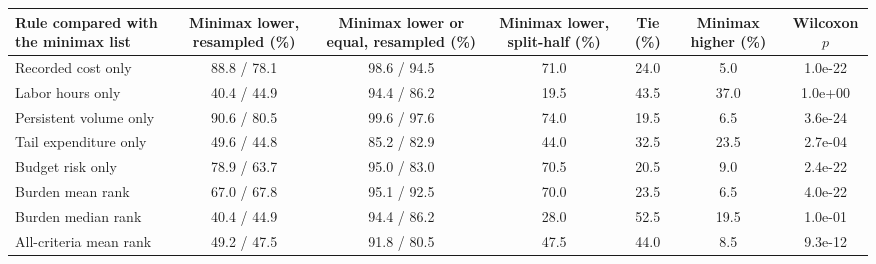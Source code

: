\begin{tabular}{p{3.6cm}cccccc}
\toprule
Rule compared with the minimax list & Minimax lower, resampled (\%) & Minimax lower or equal, resampled (\%) & Minimax lower, split-half (\%) & Tie (\%) & Minimax higher (\%) & Wilcoxon $p$ \\
\midrule
Recorded cost only & 88.8 / 78.1 & 98.6 / 94.5 & 71.0 & 24.0 & 5.0 & 1.0e-22 \\
Labor hours only & 40.4 / 44.9 & 94.4 / 86.2 & 19.5 & 43.5 & 37.0 & 1.0e+00 \\
Persistent volume only & 90.6 / 80.5 & 99.6 / 97.6 & 74.0 & 19.5 & 6.5 & 3.6e-24 \\
Tail expenditure only & 49.6 / 44.8 & 85.2 / 82.9 & 44.0 & 32.5 & 23.5 & 2.7e-04 \\
Budget risk only & 78.9 / 63.7 & 95.0 / 83.0 & 70.5 & 20.5 & 9.0 & 2.4e-22 \\
Burden mean rank & 67.0 / 67.8 & 95.1 / 92.5 & 70.0 & 23.5 & 6.5 & 4.0e-22 \\
Burden median rank & 40.4 / 44.9 & 94.4 / 86.2 & 28.0 & 52.5 & 19.5 & 1.0e-01 \\
All-criteria mean rank & 49.2 / 47.5 & 91.8 / 80.5 & 47.5 & 44.0 & 8.5 & 9.3e-12 \\
\bottomrule
\end{tabular}
